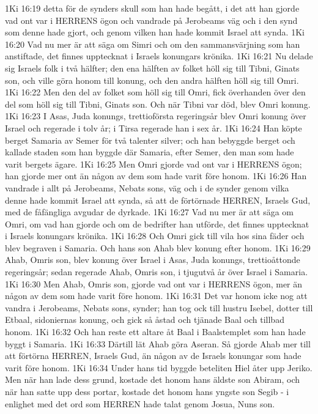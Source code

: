 1Ki 16:19  detta för de synders skull som han hade begått, i det att han gjorde vad ont var i HERRENS ögon och vandrade på Jerobeams väg och i den synd som denne hade gjort, och genom vilken han hade kommit Israel att synda.
1Ki 16:20  Vad nu mer är att säga om Simri och om den sammansvärjning som han anstiftade, det finnes upptecknat i Israels konungars krönika.
1Ki 16:21  Nu delade sig Israels folk i två hälfter; den ena hälften av folket höll sig till Tibni, Ginats son, och ville göra honom till konung, och den andra hälften höll sig till Omri.
1Ki 16:22  Men den del av folket som höll sig till Omri, fick överhanden över den del som höll sig till Tibni, Ginats son. Och när Tibni var död, blev Omri konung.
1Ki 16:23  I Asas, Juda konungs, trettioförsta regeringsår blev Omri konung över Israel och regerade i tolv år; i Tirsa regerade han i sex år.
1Ki 16:24  Han köpte berget Samaria av Semer för två talenter silver; och han bebyggde berget och kallade staden som han byggde där Samaria, efter Semer, den man som hade varit bergets ägare.
1Ki 16:25  Men Omri gjorde vad ont var i HERRENS ögon; han gjorde mer ont än någon av dem som hade varit före honom.
1Ki 16:26  Han vandrade i allt på Jerobeams, Nebats sons, väg och i de synder genom vilka denne hade kommit Israel att synda, så att de förtörnade HERREN, Israels Gud, med de fåfängliga avgudar de dyrkade.
1Ki 16:27  Vad nu mer är att säga om Omri, om vad han gjorde och om de bedrifter han utförde, det finnes upptecknat i Israels konungars krönika.
1Ki 16:28  Och Omri gick till vila hos sina fäder och blev begraven i Samaria. Och hans son Ahab blev konung efter honom.
1Ki 16:29  Ahab, Omris son, blev konung över Israel i Asas, Juda konungs, trettioåttonde regeringsår; sedan regerade Ahab, Omris son, i tjugutvå år över Israel i Samaria.
1Ki 16:30  Men Ahab, Omris son, gjorde vad ont var i HERRENS ögon, mer än någon av dem som hade varit före honom.
1Ki 16:31  Det var honom icke nog att vandra i Jerobeams, Nebats sons, synder; han tog ock till hustru Isebel, dotter till Etbaal, sidoniernas konung, och gick så åstad och tjänade Baal och tillbad honom.
1Ki 16:32  Och han reste ett altare åt Baal i Baalstemplet som han hade byggt i Samaria.
1Ki 16:33  Därtill lät Ahab göra Aseran. Så gjorde Ahab mer till att förtörna HERREN, Israels Gud, än någon av de Israels konungar som hade varit före honom.
1Ki 16:34  Under hans tid byggde beteliten Hiel åter upp Jeriko. Men när han lade dess grund, kostade det honom hans äldste son Abiram, och när han satte upp dess portar, kostade det honom hans yngste son Segib - i enlighet med det ord som HERREN hade talat genom Josua, Nuns son.
